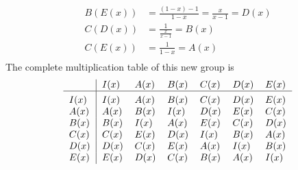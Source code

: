 \documentclass[../group-theory-in-a-nutshell-for-physicists.tex]{subfiles}
\begin{document}
\begin{questions}
\begin{solution}
\begin{align*}
		B(E(x)) &= \frac{(1 - x) - 1}{1 - x} = \frac{x}{x - 1} = D(x)\\
		C(D(x)) &= \frac{1}{\frac{x}{x - 1}} = B(x) \\
		C(E(x)) &= \frac{1}{1 - x} = A(x) \\
	\end{align*}
	The complete multiplication table of this new group is
	\begin{align*}
	\begin{tabular}{>{$}l<{$}|*{6}{>{$}l<{$}}}
	~    & I(x) & A(x) & B(x) & C(x) & D(x) & E(x) \\
	\hline\vrule height 12pt width 0pt
	I(x) & I(x) & A(x) & B(x) & C(x) & D(x) & E(x) \\
	A(x) & A(x) & B(x) & I(x) & D(x) & E(x) & C(x) \\
	B(x) & B(x) & I(x) & A(x) & E(x) & C(x) & D(x) \\
	C(x) & C(x) & E(x) & D(x) & I(x) & B(x) & A(x) \\
	D(x) & D(x) & C(x) & E(x) & A(x) & I(x) & B(x) \\
	E(x) & E(x) & D(x) & C(x) & B(x) & A(x) & I(x) \\
	\end{tabular} 
	\end{align*}
\end{solution}

\end{questions}
\end{document}
